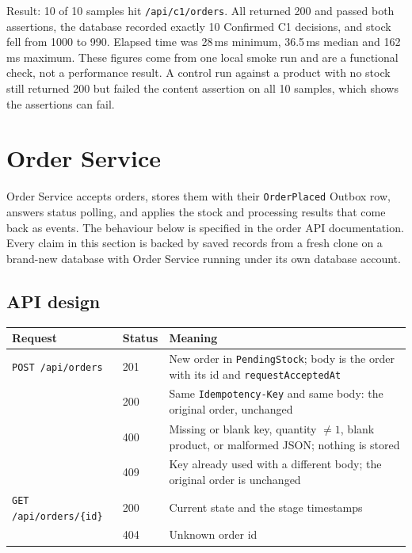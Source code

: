 \documentclass[a4paper]{report}
\begin{document}
Result: 10 of 10 samples hit \texttt{/api/c1/orders}. All returned 200 and
passed both assertions, the database recorded exactly 10 Confirmed C1 decisions, and stock
fell from 1000 to 990. Elapsed time was 28\,ms minimum, 36.5\,ms median and
162\,ms maximum. These figures come from one local smoke run and are a
functional check, not a performance result. A control run against a product
with no stock still returned 200 but failed the content assertion on all 10
samples, which shows the assertions can fail.

\section{Order Service}
\label{sec:order-service}

Order Service accepts orders, stores them with their \texttt{OrderPlaced}
Outbox row, answers status polling, and applies the stock and processing
results that come back as events. The behaviour below is specified in
the order API documentation. Every claim in this section is backed by saved
records from a fresh clone on a brand-new database with Order Service running
under its own database account.

\subsection{API design}

\begin{center}
\begin{tabular}{@{}llp{7.4cm}@{}}
\toprule
Request & Status & Meaning \\
\midrule
\texttt{POST /api/orders} & 201 & New order in \texttt{PendingStock}; body is the order with its id and \texttt{requestAcceptedAt} \\
 & 200 & Same \texttt{Idempotency-Key} and same body: the original order, unchanged \\
 & 400 & Missing or blank key, quantity $\neq 1$, blank product, or malformed JSON; nothing is stored \\
 & 409 & Key already used with a different body; the original order is unchanged \\
\texttt{GET /api/orders/\{id\}} & 200 & Current state and the stage timestamps \\
 & 404 & Unknown order id \\
\bottomrule
\end{tabular}
\end{center}
\end{document}
